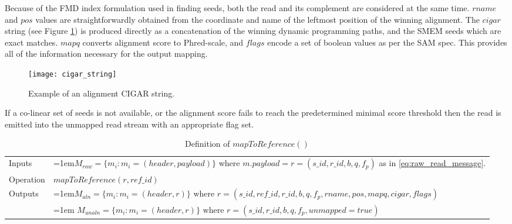Because of the FMD index formulation used in finding seeds, both the read and its complement are considered at the same time. $rname$ and $pos$ values are straightforwardly obtained from the coordinate and name of the leftmost position of the winning alignment. The $cigar$ string (see Figure \ref{fig:main_body_cigar_string}) is produced directly as a concatenation of the winning dynamic programming paths, and the SMEM seeds which are exact matches. $mapq$ converts alignment score to Phred-scale, and $flags$ encode a set of boolean values as per the SAM spec. This provides all of the information necessary for the output mapping.

\begin{figure}[H]
    \texttt{[image: cigar\_string]}
    \centering
    \caption {Example of an alignment CIGAR string.}
    \label{fig:main_body_cigar_string}
\end{figure}

If a co-linear set of seeds is not available, or the alignment score fails to reach the predetermined minimal score threshold then the read is emitted into the unmapped read stream with an appropriate flag set.

\bgroup
\def\arraystretch{1.5}
\begin{table}[!ht]
    \caption{Definition of $mapToReference()$}
    \label{tab:op_map_read_to_reference}
    {\begin{tabular}{l|p{12cm}}
    \toprule
    Inputs & \hangindent=1em$M_{raw} = \{m_i: m_i = (header, payload)\}$ where $m.payload = r = (s\_id, r\_id, b, q, f_p)$ as in \ref{eq:raw_read_message}. \\
    \cline{2-2}
    Operation & $mapToReference(r, ref\_id)$\\
    \cline{2-2}
    \multirow{2}{*}{Outputs} & \hangindent=1em$M_{aln} = \{m_i: m_i = (header, r)\} \text{ where } r = (s\_id, ref\_id, r\_id, b, q, f_p, rname, pos, mapq, cigar, flags)$\\
    & \hangindent=1em $M_{unaln} = \{m_i: m_i = (header, r)\} \text{  where } r = (s\_id, r\_id, b, q, f_p, unmapped=true)$\\
    \bottomrule
    \end{tabular}}
\end{table}
\egroup

